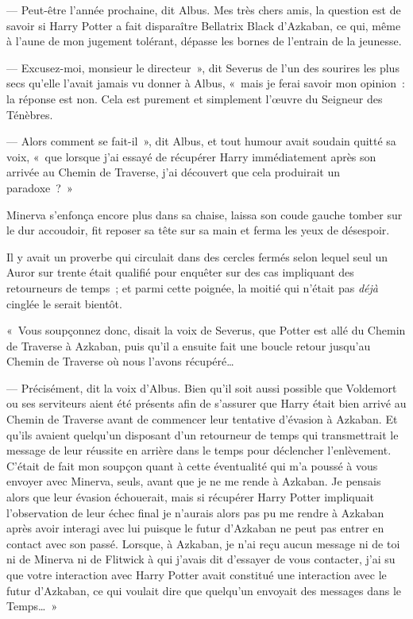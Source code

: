 --- Peut-être l'année prochaine, dit Albus.
Mes très chers amis, la question est de savoir si Harry Potter a fait disparaître Bellatrix Black d'Azkaban, ce qui, même à l'aune de mon jugement tolérant, dépasse les bornes de l'entrain de la jeunesse.

--- Excusez-moi, monsieur le directeur~», dit Severus de l'un des sourires les plus secs qu'elle l'avait jamais vu donner à Albus, «~mais je ferai savoir mon opinion~: la réponse est non.
Cela est purement et simplement l'œuvre du Seigneur des Ténèbres.

--- Alors comment se fait-il~», dit Albus, et tout humour avait soudain quitté sa voix, «~que lorsque j'ai essayé de récupérer Harry immédiatement après son arrivée au Chemin de Traverse, j'ai découvert que cela produirait un paradoxe~?~»

Minerva s'enfonça encore plus dans sa chaise, laissa son coude gauche tomber sur le dur accoudoir, fit reposer sa tête sur sa main et ferma les yeux de désespoir.

Il y avait un proverbe qui circulait dans des cercles fermés selon lequel seul un Auror sur trente était qualifié pour enquêter sur des cas impliquant des retourneurs de temps~; et parmi cette poignée, la moitié qui n'était pas \emph{déjà} cinglée le serait bientôt.

«~Vous soupçonnez donc, disait la voix de Severus, que Potter est allé du Chemin de Traverse à Azkaban, puis qu'il a ensuite fait une boucle retour jusqu'au Chemin de Traverse où nous l'avons récupéré…

--- Précisément, dit la voix d'Albus.
Bien qu'il soit aussi possible que Voldemort ou ses serviteurs aient été présents afin de s'assurer que Harry était bien arrivé au Chemin de Traverse avant de commencer leur tentative d'évasion à Azkaban.
Et qu'ils avaient quelqu'un disposant d'un retourneur de temps qui transmettrait le message de leur réussite en arrière dans le temps pour déclencher l'enlèvement.
C'était de fait mon soupçon quant à cette éventualité qui m'a poussé à vous envoyer avec Minerva, seuls, avant que je ne me rende à Azkaban.
Je pensais alors que leur évasion échouerait, mais si récupérer Harry Potter impliquait l'observation de leur échec final je n'aurais alors pas pu me rendre à Azkaban après avoir interagi avec lui puisque le futur d'Azkaban ne peut pas entrer en contact avec son passé.
Lorsque, à Azkaban, je n'ai reçu aucun message ni de toi ni de Minerva ni de Flitwick à qui j'avais dit d'essayer de vous contacter, j'ai su que votre interaction avec Harry Potter avait constitué une interaction avec le futur d'Azkaban, ce qui voulait dire que quelqu'un envoyait des messages dans le Temps…~»

